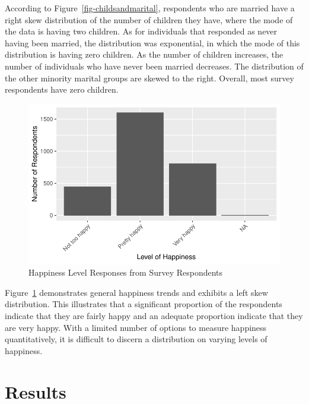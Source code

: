 \documentclass[
]{article}
\begin{document}
According to Figure~\ref{fig-childsandmarital}, respondents who are
married have a right skew distribution of the number of children they
have, where the mode of the data is having two children. As for
individuals that responded as never having been married, the
distribution was exponential, in which the mode of this distribution is
having zero children. As the number of children increases, the number of
individuals who have never been married decreases. The distribution of
the other minority marital groups are skewed to the right. Overall, most
survey respondents have zero children.

\begin{figure}

{\centering \includegraphics{paper_files/figure-pdf/fig-happiness-1.pdf}

}

\caption{\label{fig-happiness}Happiness Level Responses from Survey
Respondents}

\end{figure}

Figure~\ref{fig-happiness} demonstrates general happiness trends and
exhibits a left skew distribution. This illustrates that a significant
proportion of the respondents indicate that they are fairly happy and an
adequate proportion indicate that they are very happy. With a limited
number of options to measure happiness quantitatively, it is difficult
to discern a distribution on varying levels of happiness.

\hypertarget{results}{%
\section{Results}\label{results}}
\end{document}
